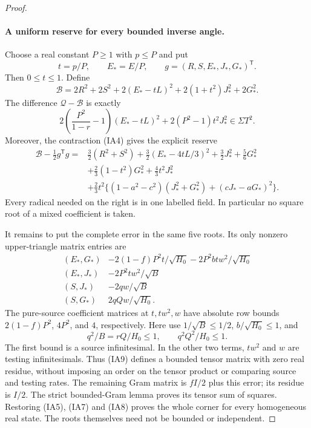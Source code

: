 \begin{proof}
\paragraph{A uniform reserve for every bounded inverse angle.}
Choose a real constant $P\ge1$ with $p\le P$ and put
\[
 t=p/P,\qquad E_*=E/P,\qquad
 g=(R,S,E_*,J_*,G_*)^{\mathsf T}.
\]
Then $0\le t\le1$. Define
\[
 \mathcal B=2R^2+2S^2+2(E_*-tL)^2
                         +2(1+t^2)J_*^2+2G_*^2.
\]
The difference $\mathcal Q-\mathcal B$ is exactly
\[
 2\left(\frac{P^2}{1-r}-1\right)(E_*-tL)^2
                    +2(P^2-1)t^2J_*^2\in\Sigma T^2.
                                                               \tag{IA7}
\]
Moreover, the contraction (IA4) gives the explicit reserve
\[
\begin{split}
 \mathcal B-\tfrac12g^{\mathsf T}g
 ={}&\tfrac32(R^2+S^2)
       +\tfrac32(E_*-4tL/3)^2+\tfrac32J_*^2+\tfrac56G_*^2\\
 &+\tfrac23(1-t^2)G_*^2+\tfrac43t^2J_*^2\\
 &+\tfrac23t^2\{(1-a^2-c^2)(J_*^2+G_*^2)
                                   +(cJ_*-aG_*)^2\}.
\end{split}                                                    \tag{IA8}
\]
Every radical needed on the right is in one labelled field.
In particular no square root of a mixed coefficient is taken.

It remains to put the complete error in the same five roots.
Its only nonzero upper-triangle matrix entries are
\[
\begin{array}{c|c}
 (E_*,G_*)&-2(1-f)P^2t/\sqrt{H_0}
                         -2P^2btw^2/\sqrt{H_0}\\
 (E_*,J_*)&-2P^2tw^2/\sqrt B\\
 (S,J_*)&-2qw/\sqrt B\\
 (S,G_*)& 2qQw/\sqrt{H_0}.
\end{array}                                                    \tag{IA9}
\]
The pure-source coefficient matrices at $t,tw^2,w$ have absolute
row bounds $2(1-f)P^2$, $4P^2$, and $4$, respectively. Here use
$1/\sqrt B\le1/2$, $b/\sqrt{H_0}\le1$, and
\[
 q^2/B=rQ/H_0\le1,\qquad q^2Q^2/H_0\le1.
\]
The first bound is a source infinitesimal. In the other two terms,
$tw^2$ and $w$ are testing infinitesimals. Thus (IA9) defines a
bounded tensor matrix with zero real residue, without imposing an
order on the tensor product or comparing source and testing rates.
The remaining Gram matrix is $fI/2$ plus this error; its residue is
$I/2$. The strict bounded-Gram lemma proves its tensor sum of
squares. Restoring (IA5), (IA7) and (IA8) proves the whole corner
for every homogeneous real state. The roots themselves need not
be bounded or independent.


\end{proof}

